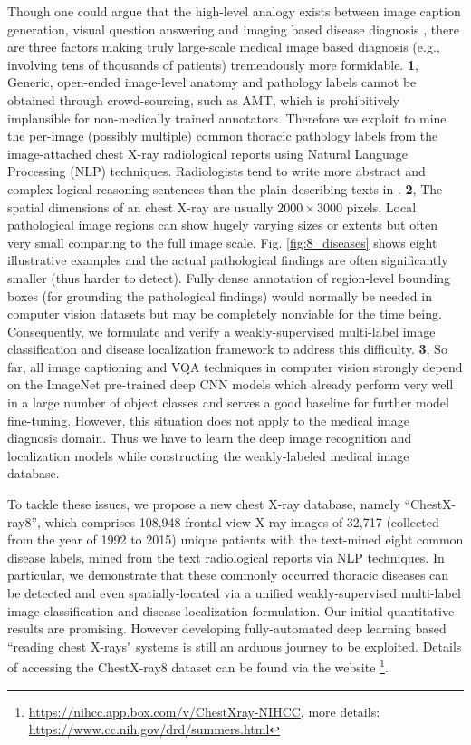 \documentclass[10pt,twocolumn,letterpaper]{article}
\begin{document}
Though one could argue that the high-level analogy exists between image caption generation, visual question answering and imaging based disease diagnosis \cite{Shin2016Learning,Shin2016Interleaved}, there are three factors making truly large-scale medical image based diagnosis (e.g., involving tens of thousands of patients) tremendously more formidable. {\bf 1}, Generic, open-ended image-level anatomy and pathology labels cannot be obtained through crowd-sourcing, such as AMT, which is prohibitively implausible for non-medically trained annotators. Therefore we exploit to mine the per-image (possibly multiple) common thoracic pathology labels from the image-attached chest X-ray radiological reports using Natural Language Processing (NLP) techniques. Radiologists tend to write more abstract and complex logical reasoning sentences than the plain describing texts in \cite{Young2014From,Lin2014COCO}. {\bf 2}, The spatial dimensions of an chest X-ray are usually $2000 \times 3000$ pixels. Local pathological image regions can show hugely varying sizes or extents but often very small comparing to the full image scale. Fig. \ref{fig:8_diseases} shows eight illustrative examples and the actual pathological findings are often significantly smaller (thus harder to detect). Fully dense annotation of region-level bounding boxes (for grounding the pathological findings) would normally be needed in computer vision datasets \cite{Plummer2015Flickr30k,Zhu2016Visual7W,krishnavisualgenome} but may be completely nonviable for the time being. Consequently, we formulate and verify a weakly-supervised multi-label image classification and disease localization framework to address this difficulty. {\bf 3}, So far, all image captioning and VQA techniques in computer vision strongly depend on the ImageNet pre-trained deep CNN models which already perform very well in a large number of object classes and serves a good baseline for further model fine-tuning. However, this situation does not apply to the medical image diagnosis domain. Thus we have to learn the deep image recognition and localization models while constructing the weakly-labeled medical image database. 

To tackle these issues, we propose a new chest X-ray database, namely ``ChestX-ray8'', which comprises 108,948 frontal-view X-ray images of 32,717 (collected from the year of 1992 to 2015) unique patients with the text-mined eight common disease labels, mined from the text radiological reports via NLP techniques. In particular, we demonstrate that these commonly occurred thoracic diseases can be detected and even spatially-located via a unified weakly-supervised multi-label image classification and disease localization formulation. Our initial quantitative results are promising. However developing fully-automated deep learning based ``reading chest X-rays" systems is still an arduous journey to be exploited. Details of accessing the ChestX-ray8 dataset can be found via the website \footnote{ %
\url{https://nihcc.app.box.com/v/ChestXray-NIHCC}, more details: \url{https://www.cc.nih.gov/drd/summers.html}}.
\end{document}
